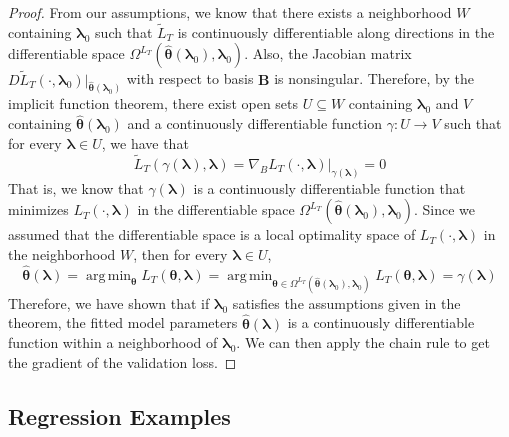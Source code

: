 \documentclass[12pt,letterpaper]{article}
\DeclareMathOperator*{\argmin}{arg\,min}
\begin{document}
\begin{proof}
From our assumptions, we know that there exists a neighborhood $W$ containing $\boldsymbol \lambda_0$ such that $\tilde L_T$ is continuously differentiable along directions in the differentiable space $\Omega^{L_T}(\hat {\boldsymbol \theta}(\boldsymbol \lambda_0), \boldsymbol \lambda_0)$. Also, the Jacobian matrix $D \tilde L_T(\cdot, \boldsymbol \lambda_0)|_{\hat {\boldsymbol \theta}(\boldsymbol \lambda_0)}$ with respect to basis $\boldsymbol B$ is nonsingular. Therefore, by the implicit function theorem, there exist open sets $U \subseteq W$ containing $\boldsymbol \lambda_0$ and $V$ containing $\hat {\boldsymbol \theta}(\boldsymbol \lambda_0)$ and a continuously differentiable function $\gamma: U \rightarrow V$ such that for every $\boldsymbol \lambda \in U$, we have that 
\begin{equation}
\tilde L_T(\gamma(\boldsymbol \lambda), \boldsymbol \lambda) = \nabla_{B} L_T(\cdot, \boldsymbol \lambda)|_{\gamma(\boldsymbol \lambda)} = 0
\end{equation}
That is, we know that $\gamma(\boldsymbol \lambda)$ is a continuously differentiable function that minimizes $L_T(\cdot, \boldsymbol \lambda)$ in the differentiable space  $\Omega^{L_T}(\hat {\boldsymbol \theta}(\boldsymbol \lambda_0), \boldsymbol \lambda_0)$.
Since we assumed that the differentiable space is a local optimality space of $L_T(\cdot, \boldsymbol \lambda)$ in the neighborhood $W$, then for every $\boldsymbol \lambda \in U$, 
\begin{equation}
\hat {\boldsymbol \theta}(\boldsymbol \lambda) =
\argmin_{\boldsymbol \theta} L_T(\boldsymbol \theta, \boldsymbol \lambda) =
\argmin_{\boldsymbol \theta \in \Omega^{L_T}(\hat {\boldsymbol \theta}(\boldsymbol \lambda_0), \boldsymbol \lambda_0)} L_T(\boldsymbol \theta, \boldsymbol \lambda) =
\gamma(\boldsymbol \lambda)
\end{equation}
Therefore, we have shown that if $\boldsymbol \lambda_0$ satisfies the assumptions given in the theorem, the fitted model parameters $\hat {\boldsymbol \theta}(\boldsymbol \lambda)$ is a continuously differentiable function within a neighborhood of $\boldsymbol \lambda_0$. We can then apply the chain rule to get the gradient of the validation loss.
\end{proof}

\subsection{Regression Examples}
\end{document}
